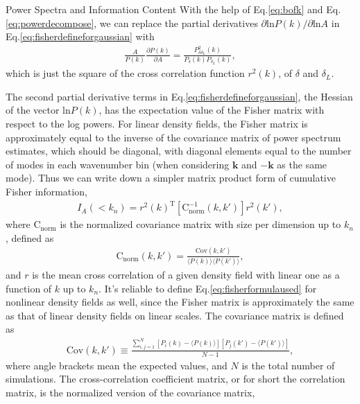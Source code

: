 \begin{section}{Power Spectra and Information Content}
   With the help of Eq.\ref{eq:bofk} and Eq.\ref{eq:powerdecompose}, we can replace the partial derivatives 
$\partial \mathrm{ln} P(k) / \partial \mathrm{ln} A$ in Eq.\ref{eq:fisherdefineforgaussian} with 
\begin{align}
   \frac{A}{P(k)}\frac{\partial P(k)}{\partial A}=\frac{P_{\delta \delta_L}^2(k)}{P_\delta(k) P_{\delta_L}(k)},
\end{align}
which is just the square of the 
cross correlation function $r ^2 (k)$, of $\delta$ and $\delta_L$. 

The second partial derivative terms in 
Eq.\ref{eq:fisherdefineforgaussian}, the Hessian of the vector $\mathrm{ln} P(k)$, has the expectation 
value of the Fisher matrix with respect to the log powers. For linear density fields, the Fisher matrix is 
approximately equal to the inverse of the covariance matrix of power spectrum estimates, which should be diagonal, 
with diagonal elements equal to the number of modes in each wavenumber bin (when considering $\bm{k}$ and $-\bm{k}$ 
as the same mode). Thus we can write down a simpler matrix product form of cumulative Fisher information, 
\begin{align}
    I_A \left( < k_n\right) = r^2(k)^{\mathrm{T}} \left[ \mathrm{C^{-1}_{norm}} ( k,k' )\right] r^2(k') ,
\label{eq:fisherformulaused}
\end{align}
where $\mathrm{C_{norm}}$ is the normalized covariance matrix with size per dimension up to $k_n$, defined as
\begin{align}
    \mathrm{C_{norm}} \left( k,k' \right)=\frac{\mathrm{Cov}(k,k')}{\langle P(k)\rangle\langle P(k')\rangle},
\end{align}
and $r$ is the mean cross correlation of a given density field with linear one as a function of $k$ up to $k_n$. 
It's reliable to define Eq.\ref{eq:fisherformulaused} for nonlinear density fields as well, 
since the Fisher matrix is approximately the same as that of linear density fields on linear scales. 
The covariance matrix is defined as 
\begin{align}
    \mathrm{Cov}\left(k,k'\right)\equiv \frac{\sum_{i,j=1}^{N}\left[ P_i \left( k \right) - 
\langle P \left( k \right) \rangle \right]\left[ P_j \left( k' \right) - \langle P \left( k' \right)\rangle \right]}{N-1},
\end{align}
where angle brackets mean the expected values, and $N$ is the total number of simulations.
    The  cross-correlation coefficient matrix, or for short the correlation matrix, is the normalized version of the covariance matrix,

\end{section}
